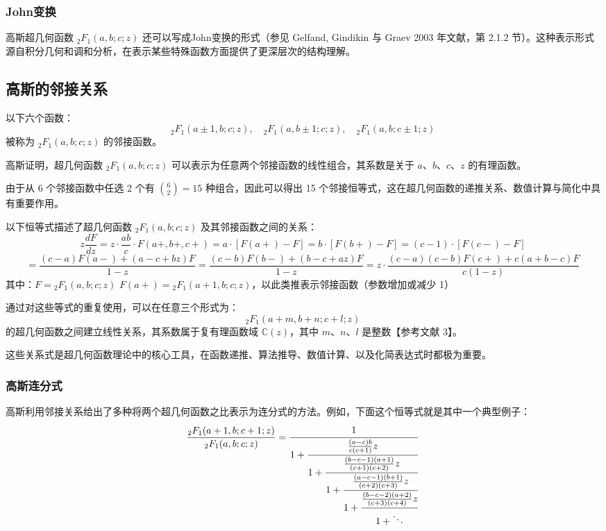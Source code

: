 \subsubsection{John变换}
高斯超几何函数 ${}_2F_1(a, b; c; z)$ 还可以写成John变换的形式（参见 Gelfand, Gindikin 与 Graev 2003 年文献，第 2.1.2 节）。这种表示形式源自积分几何和调和分析，在表示某些特殊函数方面提供了更深层次的结构理解。
\subsection{高斯的邻接关系}
以下六个函数：
$$
{}_2F_1(a \pm 1, b; c; z), \quad
{}_2F_1(a, b \pm 1; c; z), \quad
{}_2F_1(a, b; c \pm 1; z)~
$$
被称为 ${}_2F_1(a, b; c; z)$ 的邻接函数。

高斯证明，超几何函数 ${}_2F_1(a, b; c; z)$ 可以表示为任意两个邻接函数的线性组合，其系数是关于 $a$、$b$、$c$、$z$ 的有理函数。

由于从 6 个邻接函数中任选 2 个有 $\binom{6}{2} = 15$ 种组合，因此可以得出 15 个邻接恒等式，这在超几何函数的递推关系、数值计算与简化中具有重要作用。

以下恒等式描述了超几何函数 ${}_2F_1(a, b; c; z)$ 及其邻接函数之间的关系：
$$
z \frac{dF}{dz}
= z \cdot \frac{ab}{c} \cdot F(a{+}, b{+}, c{+})  
= a \cdot \left[F(a{+}) - F\right]  
= b \cdot \left[F(b{+}) - F\right]  
= (c - 1) \cdot \left[F(c{-}) - F\right]~ 
$$
$$
= \frac{(c - a)F(a{-}) + (a - c + bz)F}{1 - z}  
= \frac{(c - b)F(b{-}) + (b - c + az)F}{1 - z}  
= z \cdot \frac{(c - a)(c - b)F(c{+}) + c(a + b - c)F}{c(1 - z)}~ 
$$
其中：$F = {}_2F_1(a, b; c; z)$ $F(a{+}) = {}_2F_1(a + 1, b; c; z)$，以此类推表示邻接函数（参数增加或减少 1）

通过对这些等式的重复使用，可以在任意三个形式为：
$$
{}_2F_1(a + m, b + n; c + l; z)~ 
$$
的超几何函数之间建立线性关系，其系数属于复有理函数域 $\mathbb{C}(z)$，其中 $m$、$n$、$l$ 是整数【参考文献 3】。

这些关系式是超几何函数理论中的核心工具，在函数递推、算法推导、数值计算、以及化简表达式时都极为重要。
\subsubsection{高斯连分式}
高斯利用邻接关系给出了多种将两个超几何函数之比表示为连分式的方法。例如，下面这个恒等式就是其中一个典型例子：
$$
\frac{{}_2F_1(a+1, b; c+1; z)}{{}_2F_1(a, b; c; z)} = 
\cfrac{1}{1 + \cfrac{\frac{(a - c)b}{c(c + 1)} z}{1 + \cfrac{\frac{(b - c - 1)(a + 1)}{(c + 1)(c + 2)} z}{1 + \cfrac{\frac{(a - c - 1)(b + 1)}{(c + 2)(c + 3)} z}{1 + \cfrac{\frac{(b - c - 2)(a + 2)}{(c + 3)(c + 4)} z}{1 + \ddots}}}}}~
$$
